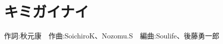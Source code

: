 \section{キミガイナイ}

\begin{center}
    \scriptsize{
        作詞:秋元康　作曲:SoichiroK、Nozomu.S　編曲:Soulife、後藤勇一郎
    }
\end{center}

\vspace{0.7em}

\begin{Parallel}[c]{0.47\textwidth}{0.47\textwidth}
	
\ParallelLText{
    \footnotesize{
        
    }
}

\ParallelRText{
    \footnotesize{
        
    }
}

\end{Parallel}
